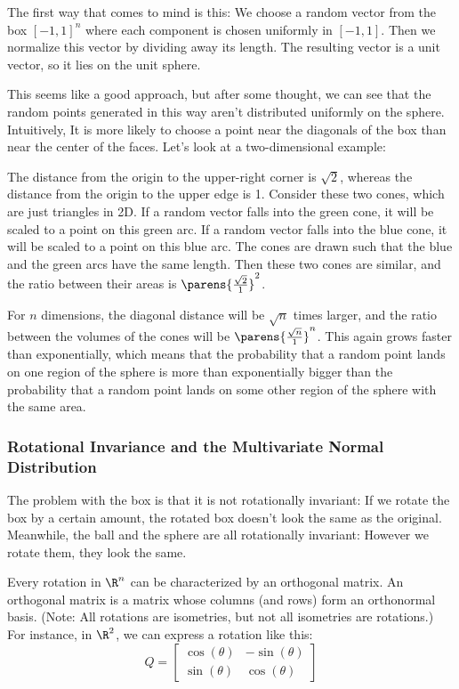 \documentclass{article}
\begin{document}
The first way that comes to mind is this: We choose a random vector from the box $[-1, 1]^n$ where each component is chosen uniformly in $[-1, 1]$. Then we normalize this vector by dividing away its length. The resulting vector is a unit vector, so it lies on the unit sphere.

This seems like a good approach, but after some thought, we can see that the random points generated in this way aren't distributed uniformly on the sphere. Intuitively, It is more likely to choose a point near the diagonals of the box than near the center of the faces. Let's look at a two-dimensional example:


The distance from the origin to the upper-right corner is $\sqrt{2}$, whereas the distance from the origin to the upper edge is 1. Consider these two cones, which are just triangles in 2D. If a random vector falls into the green cone, it will be scaled to a point on this green arc. If a random vector falls into the blue cone, it will be scaled to a point on this blue arc. The cones are drawn such that the blue and the green arcs have the same length. Then these two cones are similar, and the ratio between their areas is $\parens{\frac{\sqrt{2}}{1}}^2$.

For $n$ dimensions, the diagonal distance will be $\sqrt{n}$ times larger, and the ratio between the volumes of the cones will be $\parens{\frac{\sqrt{n}}{1}}^n$. This again grows faster than exponentially, which means that the probability that a random point lands on one region of the sphere is more than exponentially bigger than the probability that a random point lands on some other region of the sphere with the same area.

\subsubsection{Rotational Invariance and the Multivariate Normal Distribution}

The problem with the box is that it is not rotationally invariant: If we rotate the box by a certain amount, the rotated box doesn't look the same as the original. Meanwhile, the ball and the sphere are all rotationally invariant: However we rotate them, they look the same.

Every rotation in $\R^n$ can be characterized by an orthogonal matrix. An orthogonal matrix is a matrix whose columns (and rows) form an orthonormal basis. (Note: All rotations are isometries, but not all isometries are rotations.) For instance, in $\R^2$, we can express a rotation like this:
\[
    Q = \begin{bmatrix}
        \cos(\theta) & -\sin(\theta) \\
        \sin(\theta) & \cos(\theta)
    \end{bmatrix}
\]
\end{document}
